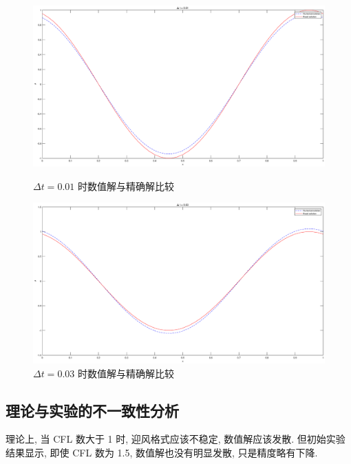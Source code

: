 \documentclass[12pt,a4paper]{article}
\begin{document}
            \begin{figure}[H]
                \centering
                \begin{minipage}{0.45\textwidth}
                    \centering
                    \includegraphics[width=\linewidth]{fig/result_001.eps}
                    \caption{$\Delta t = 0.01$ 时数值解与精确解比较}
                    \label{fig:result_001}
                \end{minipage}
                \hfill
                \begin{minipage}{0.45\textwidth}
                    \centering
                    \includegraphics[width=\linewidth]{fig/result_003.eps}
                    \caption{$\Delta t = 0.03$ 时数值解与精确解比较}
                    \label{fig:result_003}
                \end{minipage}
            \end{figure}

        \subsection{理论与实验的不一致性分析}
            理论上, 当 CFL 数大于 1 时, 迎风格式应该不稳定, 数值解应该发散. 但初始实验结果显示, 即使 CFL 数为 1.5, 数值解也没有明显发散, 只是精度略有下降.
\end{document}
